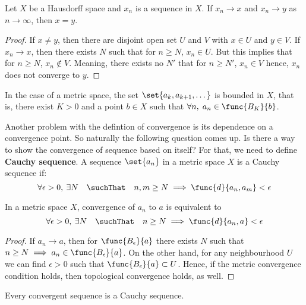 \begin{proposition}
    Let \(X\) be a Hausdorff space and \(x_n\) is a sequence in \(X\). If \(x_n \to x\) and \(x_n \to y\) as \(n \to \infty\), then \(x = y\).
\end{proposition}

\begin{proof}
    If \(x \neq y\), then there are disjoint open set \(U\) and \(V\) with \(x \in U\) and \(y \in V\). If \(x_n \to x\), then there exists \(N\) such that for \(n \geq N\), \(x_n \in U\). But this implies that for \(n \geq N\), \(x_n \notin V\). Meaning, there exists no \(N'\) that for \(n \geq N'\), \(x_n \in V\) hence, \(x_n\) does not converge to \(y\).
\end{proof}

In the case of a metric space, the set \(\set{ a_k, a_{k + 1} , \dots }\) is bounded in \(X\), that is, there exist \(K > 0\) and a point \(b \in X\) such that \(\forall n,\; a_n \in \func{B_K}{b}\).

Another problem with the defintion of convergence is its dependence on a convergence point. So naturally the following question comes up. Is there a way to show the convergence of sequence based on itself?
For that, we need to define \textbf{Cauchy sequence}. A sequence \(\set{a_n}\) in a metric space \(X\) is a Cauchy sequence if:
\[\forall \epsilon > 0,\: \exists N \quad \suchThat \quad n, m \geq N \implies \func{d}{a_n,a_m} < \epsilon \]

\begin{lemma}
    In a metric space \(X\), convergence of \(a_n\) to \(a\) is equivalent to 
    \begin{equation*}
        \forall \epsilon > 0,\: \exists N \quad \suchThat \quad n \geq N \implies \func{d}{a_n , a} < \epsilon
    \end{equation*}
\end{lemma}
\begin{proof}
    If \(a_n \to a\), then for \(\func{B_{\epsilon}}{a}\) there exists \(N\) such that \(n \geq N \implies a_n \in \func{B_{\epsilon}}{a}\). On the other hand, for any neighbourhood \(U\) we can find \(\epsilon > 0\) such that \(\func{B_{\epsilon}}{a} \subset U\). Hence, if the metric convergence condition holds, then topological convergence holds, as well.
\end{proof}

\begin{theorem} \label{ConvergenceCauchy}
    Every convergent sequence is a Cauchy sequence.
\end{theorem}

